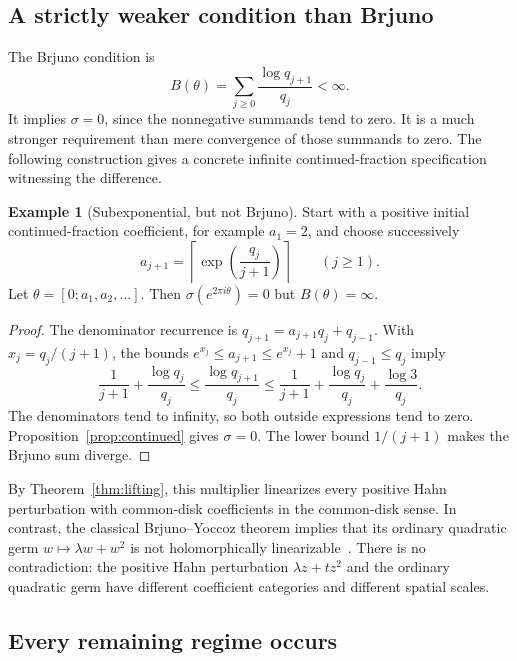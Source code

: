 \documentclass[11pt,a4paper]{article}
\numberwithin{equation}{section}
\theoremstyle{definition}
\newtheorem{example}[theorem]{Example}
\theoremstyle{remark}
\begin{document}
\subsection{A strictly weaker condition than Brjuno}

The Brjuno condition is
\begin{equation}\label{eq:brjuno}
 B(\theta)=\sum_{j\ge0}\frac{\log q_{j+1}}{q_j}<\infty.
\end{equation}
It implies $\sigma=0$, since the nonnegative summands tend to zero.
It is a much stronger requirement than mere convergence of those summands
to zero. The following construction gives a concrete infinite
continued-fraction specification witnessing the difference.

\begin{example}[Subexponential, but not Brjuno]\label{ex:nonbrjuno}
Start with a positive initial continued-fraction coefficient, for example
$a_1=2$, and choose successively
\begin{equation}\label{eq:cfzero}
 a_{j+1}=\left\lceil\exp\left(\frac{q_j}{j+1}\right)\right\rceil
       \qquad(j\ge1).
\end{equation}
Let $\theta=[0;a_1,a_2,\ldots]$. Then $\sigma(e^{2\pi i\theta})=0$
but $B(\theta)=\infty$.
\end{example}

\begin{proof}
The denominator recurrence is $q_{j+1}=a_{j+1}q_j+q_{j-1}$.
With $x_j=q_j/(j+1)$, the bounds
$e^{x_j}\le a_{j+1}\le e^{x_j}+1$ and $q_{j-1}\le q_j$ imply
\[
 \frac1{j+1}+\frac{\log q_j}{q_j}
 \le\frac{\log q_{j+1}}{q_j}
 \le\frac1{j+1}+\frac{\log q_j}{q_j}+\frac{\log3}{q_j}.
\]
The denominators tend to infinity, so both outside expressions tend to
zero. Proposition~\ref{prop:continued} gives $\sigma=0$. The lower bound
$1/(j+1)$ makes the Brjuno sum diverge.
\end{proof}

By Theorem~\ref{thm:lifting}, this multiplier linearizes every positive
Hahn perturbation with common-disk coefficients in the common-disk sense.
In contrast, the classical Brjuno--Yoccoz theorem implies that its ordinary
quadratic germ $w\mapsto\lambda w+w^2$ is not holomorphically
linearizable~\cite{Yoccoz}. There is no contradiction: the positive Hahn
perturbation $\lambda z+tz^2$ and the ordinary quadratic germ have different
coefficient categories and different spatial scales.

\subsection{Every remaining regime occurs}
\end{document}
